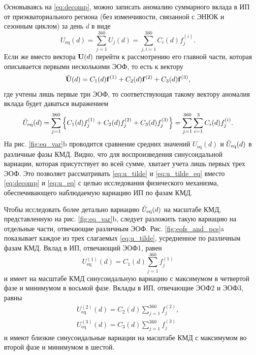 Основываясь на \eqref{eq:decomp}, можно записать аномалию суммарного вклада в ИП от приэкваториального региона (без изменчивости, связанной с ЭНЮК и сезонным циклом) за день $d$ в виде
\begin{equation}
\label{eq:u_eq}
    U_{\mathrm{eq}} (d) = \sum\limits_{j=1}^{360} U_j(d) = \sum\limits_{j,i=1}^{360} C_i(d) f_j^{(i)}.
\end{equation}
Если же вместо вектора $\vb{U}(d)$ перейти к рассмотрению его главной части, которая описывается первыми несколькими ЭОФ, то есть к вектору
\begin{equation}
\label{eq:u_tilde}
    \Tilde{\vb{U}}(d) = C_1(d) \vb{f}^{(1)} + C_2(d) \vb{f}^{(2)} + C_3(d) \vb{f}^{(3)},
\end{equation}
где учтены лишь первые три ЭОФ, то соответствующая такому вектору аномалия вклада будет даваться выражением
\begin{equation}
\label{eq:u_tilde_eq}
    \Tilde{U}_{\mathrm{eq}}(d) =\sum\limits_{j=1}^{360} \qty{C_1(d) {f}_j^{(1)} + C_2(d) {f}_j^{(2)} + C_3(d) {f}_j^{(3)}} = \sum\limits_{j=1}^{360} \sum\limits_{i=1}^{3} C_i(d) f_j^{(i)}.
\end{equation}
На рис. \ref{fig:eq_var}{b} проводится сравнение средних значений $U_{\mathrm{eq}} (d)$ и $\Tilde{U}_{\mathrm{eq}}(d)$ в различные фазы КМД. Видно, что для воспроизведения синусоидальной вариации, которая присутствует во всей сумме, хватает учета лишь первых трех ЭОФ. Это позволяет рассматривать \eqref{eq:u_tilde} и \eqref{eq:u_tilde_eq} вместо \eqref{eq:decomp} и \eqref{eq:u_eq} с целью исследования физического механизма, обеспечивающего наблюдаемую вариацию ИП по фазам КМД.

Чтобы исследовать более детально вариацию $\Tilde{U}_{\mathrm{eq}}(d)$ на масштабе КМД, представленную на рис. \ref{fig:eq_var}{b}, следует разложить такую вариацию на отдельные части, отвечающие различным ЭОФ. Рис. \ref{fig:eofs_and_pcs}{a} показывает каждое из трех слагаемых \eqref{eq:u_tilde}, усредненное по различным фазам КМД. Вклад в ИП, отвечающий ЭОФ1, равен
\begin{equation}
\label{eq:u1}
    U_\mathrm{eq}^{(1)} (d) = C_1(d) \sum\limits_{j=1}^{360} {f}_j^{(1)}
\end{equation}
и имеет на масштабе КМД синусоидальную вариацию с максимумом в четвертой фазе и минимумом в восьмой фазе. Вклады в ИП, отвечающие ЭОФ2 и ЭОФ3, равны
\begin{equation}
\label{eq:u23}
    \begin{split}
        U_\mathrm{eq}^{(2)} (d) = C_2(d) \sum\limits_{j=1}^{360} {f}_j^{(2)},\\
        U_\mathrm{eq}^{(3)} (d) = C_3(d) \sum\limits_{j=1}^{360} {f}_j^{(3)}
    \end{split}
\end{equation}
и имеют близкие синусоидальные вариации на масштабе КМД с максимумом во второй фазе и минимумом в шестой.

